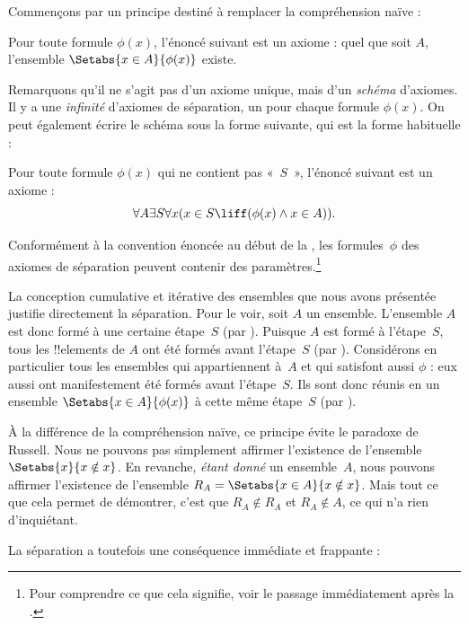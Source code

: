 \documentclass[../../../include/open-logic-section]{subfiles}
\begin{document}

Commençons par un principe destiné à remplacer la compréhension naïve :

\begin{axiom} Pour toute formule $\phi(x)$,
l'énoncé suivant est un axiome : quel que soit $A$, l'ensemble
$\Setabs{x \in A}{\phi(x)}$ existe.
\end{axiom}

Remarquons qu'il ne s'agit pas d'un axiome unique, mais d'un
\emph{schéma} d'axiomes. Il y a une \emph{infinité} d'axiomes de
séparation, un pour chaque formule $\phi(x)$. On peut également écrire
le schéma sous la forme suivante, qui est la forme habituelle :

\begin{defish}
Pour toute formule $\phi(x)$ qui ne contient pas «~$S$~», l'énoncé
suivant est un axiome :
\[
	\forall A \exists S \forall x(x \in S \liff (\phi(x) \land x \in A)).
\]
\end{defish}

Conformément à la convention énoncée au début de la
, les formules~$\phi$ des axiomes de séparation
peuvent contenir des paramètres.\footnote{Pour comprendre ce que cela
signifie, voir le passage immédiatement après la
.}

La conception cumulative et itérative des ensembles que nous avons
présentée justifie directement la séparation. Pour le voir, soit $A$
un ensemble. L'ensemble $A$ est donc formé à une certaine étape~$S$
(par \stageshier). Puisque $A$ est formé à l'étape~$S$, tous les
!!{element}s de $A$ ont été formés avant l'étape~$S$ (par \stagesacc).
Considérons en particulier tous les ensembles qui appartiennent à~$A$
et qui satisfont aussi $\phi$ : eux aussi ont manifestement été formés
avant l'étape~$S$. Ils sont donc réunis en un ensemble
$\Setabs{x \in A}{\phi(x)}$ à cette même étape~$S$ (par \stagesacc).

À la différence de la compréhension naïve, ce principe évite le
paradoxe de Russell. Nous ne pouvons pas simplement affirmer
l'existence de l'ensemble $\Setabs{x}{x \notin x}$. En revanche,
\emph{étant donné} un ensemble~$A$, nous pouvons affirmer l'existence
de l'ensemble $R_A = \Setabs{x \in A}{x \notin x}$. Mais tout ce que
cela permet de démontrer, c'est que $R_A \notin R_A$ et
$R_A \notin A$, ce qui n'a rien d'inquiétant.

La séparation a toutefois une conséquence immédiate et frappante :
\end{document}

